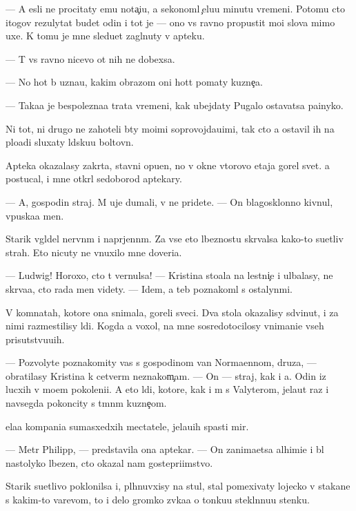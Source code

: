 \documentclass[10pt]{book}
\begin{document}
— A {\y}esli ne procitaty {\y}emu nota{\c}i{\y}u, {\y}a sekonoml{\iu} {\c}elu{\y}u minutu vremeni. Potomu cto itogov{\yi}{\y} rezulytat budet odin i tot je — ono vs{\e} ravno propustit mo{\y}i slova mimo uxe{\y}. K tomu je mne sledu{\y}et zagl{\ia}nuty v apteku.

— T{\yi} vs{\e} ravno nicevo ot nih ne dob{\y}exsa.

— No hot{\ia} b{\yi} uzna{\y}u, kakim obrazom oni hot{\ia}t po{\y}maty kuzne{\c}a.

— Taka{\y}a je bespolezna{\y}a trata vremeni, kak ubejdaty Pugalo ostavatsa pa{\y}inyko{\y}.

Ni tot, ni drugo{\y} ne zahoteli b{\yi}ty mo{\y}imi soprovojda{\y}u{\x}imi, tak cto {\y}a ostavil ih na plo{\x}adi sluxaty l{\iu}dsku{\y}u boltovn{\iu}.

Apteka okazalasy zakr{\yi}ta, stavni opu{\x}en{\yi}, no v okne vtorovo etaja gorel svet. {\Y}a postucal, i mne otkr{\yi}l sedoborod{\yi}{\y} aptekary.

— A, gospodin straj. M{\yi} uje dumali, v{\yi} ne pridete. — On blagosklonno kivnul, vpuska{\y}a men{\ia}.

Starik v{\yi}gl{\ia}del nervn{\yi}m i napr{\ia}jenn{\yi}m. Za vse{\y} eto{\y} l{\iu}beznost{\y}u skr{\yi}valsa kako{\y}-to su{\y}etliv{\yi}{\y} strah. Eto nicuty ne vnuxilo mne doveri{\y}a.

— Ludwig! Horoxo, cto t{\yi} vernulsa! — Kristina sto{\y}ala na lestni{\c}e i ul{\yi}balasy, ne skr{\yi}va{\y}a, cto rada men{\ia} videty. — Idem, {\y}a teb{\ia} poznakoml{\iu} s ostalyn{\yi}mi.

V komnatah, kotor{\yi}{\y}e ona snimala, goreli sveci. Dva stola okazalisy sdvinut{\yi}, i za nimi razmestilisy l{\iu}di. Kogda {\y}a  voxol, na mne sosredotocilosy vnimani{\y}e vseh prisutstvu{\y}u{\x}ih.

— Pozvolyte poznakomity vas s gospodinom van Norma{\y}ennom, druz{\y}a, — obratilasy Kristina k cetver{\yi}m neznakom{\c}am. — On — straj, kak i {\y}a. Odin iz lucxih v mo{\y}em pokoleni{\y}i. A eto l{\iu}di, kotor{\yi}{\y}e, kak i m{\yi} s Valyterom, jela{\y}ut raz i navsegda pokoncity s t{\e}mn{\yi}m kuzne{\c}om.

{\C}ela{\y}a kompani{\y}a sumasxedxih mectatele{\y}, jela{\y}u{\x}ih spasti mir.

— Metr Philipp, — predstavila ona aptekar{\ia}. — On zanima{\y}etsa alhimi{\y}e{\y} i b{\yi}l nastolyko l{\iu}bezen, cto okazal nam gostepri{\y}imstvo.

Starik su{\y}etlivo poklonilsa i, pl{\iu}hnuvxisy na stul, stal pomexivaty lojecko{\y} v stakane s kakim-to varevom, to i delo gromko zv{\ia}ka{\y}a o tonku{\y}u stekl{\ia}nnu{\y}u stenku.
\end{document}
